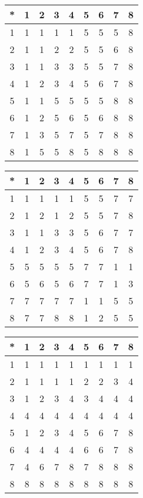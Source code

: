 \begin{tabular}[t]{c|cccccccc}
*&1&2&3&4&5&6&7&8 \\ \hline
    1&1&1&1&1&5&5&5&8 \\
    2&1&1&2&2&5&5&6&8 \\
    3&1&1&3&3&5&5&7&8 \\
    4&1&2&3&4&5&6&7&8 \\
    5&1&1&5&5&5&5&8&8 \\
    6&1&2&5&6&5&6&8&8 \\
    7&1&3&5&7&5&7&8&8 \\
    8&1&5&5&8&5&8&8&8 
\end{tabular}


\begin{tabular}[t]{c|cccccccc}
*&1&2&3&4&5&6&7&8 \\ \hline
    1&1&1&1&1&5&5&7&7 \\
    2&1&2&1&2&5&5&7&8 \\
    3&1&1&3&3&5&6&7&7 \\
    4&1&2&3&4&5&6&7&8 \\
    5&5&5&5&5&7&7&1&1 \\
    6&5&6&5&6&7&7&1&3 \\
    7&7&7&7&7&1&1&5&5 \\
    8&7&7&8&8&1&2&5&5 
\end{tabular}


\begin{tabular}[t]{c|cccccccc}
*&1&2&3&4&5&6&7&8 \\ \hline
    1&1&1&1&1&1&1&1&1 \\
    2&1&1&1&1&2&2&3&4 \\
    3&1&2&3&4&3&4&4&4 \\
    4&4&4&4&4&4&4&4&4 \\
    5&1&2&3&4&5&6&7&8 \\
    6&4&4&4&4&6&6&7&8 \\
    7&4&6&7&8&7&8&8&8 \\
    8&8&8&8&8&8&8&8&8 
\end{tabular}


